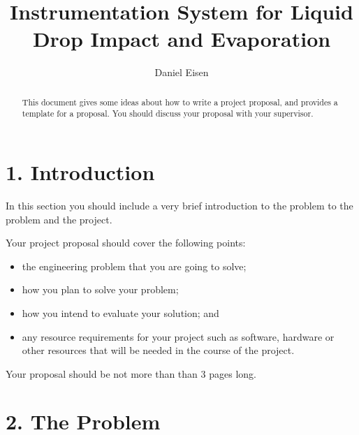 \documentclass[11pt, a4paper, twoside, openright]{report}
\title{Instrumentation System for Liquid Drop Impact and Evaporation}
\author{Daniel Eisen}
\date{}
\begin{document}
\frontmatter


\begin{abstract}
  This document gives some ideas about how to write a project
  proposal, and provides a template for a proposal. You should discuss
  your proposal with your supervisor.
\end{abstract}


\maketitle




\mainmatter


\section*{1. Introduction}

In this section you should include a very brief introduction to the
problem to the problem and the project.

Your project proposal should cover the following points:

\begin{itemize}
  \item the engineering problem that you are going to solve;
  \item how you plan to solve your problem;
  \item how you intend to evaluate your solution; and
  \item any resource requirements for your project such as software,
        hardware or other resources that will be needed in the course of the
        project.
\end{itemize}

Your proposal should be not more than than 3 pages long.

\section*{2. The Problem}
\end{document}
